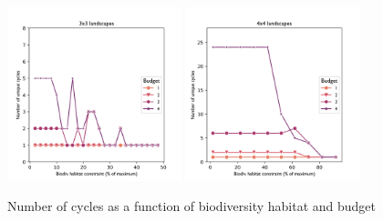 \begin{figure}[H]
    \centering
    \includegraphics[width = 0.45\textwidth]{figures/wildland/number_cycles3.png}
    \includegraphics[width = 0.45\textwidth]{figures/wildland/number_cycles4.png}
    \caption{Number of cycles as a function of biodiversity habitat and budget}
    \label{fig:distrib_cycles}
\end{figure}
\newpage
